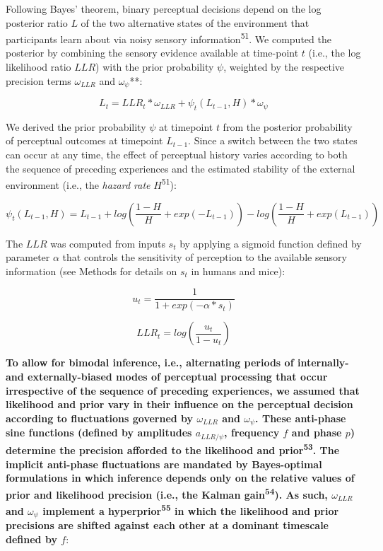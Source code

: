 \documentclass[
]{article}
\begin{document}
Following Bayes' theorem, binary perceptual decisions depend on the log
posterior ratio \(L\) of the two alternative states of the environment
that participants learn about via noisy sensory
information\textsuperscript{51}. We computed the posterior by combining
the sensory evidence available at time-point \(t\) (i.e., the log
likelihood ratio \(LLR\)) with the prior probability \(\psi\), weighted
by the respective precision terms \(\omega_{LLR}\) and
\(\omega_{\psi}\)**:

\begin{equation}
L_t = LLR_t * \omega_{LLR} + \psi_t(L_{t-1}, H) * \omega_{\psi}
\end{equation}

We derived the prior probability \(\psi\) at timepoint \(t\) from the
posterior probability of perceptual outcomes at timepoint \(L_{t-1}\).
Since a switch between the two states can occur at any time, the effect
of perceptual history varies according to both the sequence of preceding
experiences and the estimated stability of the external environment
(i.e., the \emph{hazard rate} \(H\)\textsuperscript{51}):

\begin{equation}
\psi_t(L_{t-1}, H)  = L_{t-1} + log(\frac{1-H}{H} + exp(-L_{t-1})) - log(\frac{1-H}{H} + exp(L_{t-1}))
\end{equation}

The \(LLR\) was computed from inputs \(s_t\) by applying a sigmoid
function defined by parameter \(\alpha\) that controls the sensitivity
of perception to the available sensory information (see Methods for
details on \(s_t\) in humans and mice):

\begin{equation}
u_t = \frac{1}{1 + exp(-\alpha * s_t)}
\end{equation}

\begin{equation}
LLR_t = log(\frac{u_t}{1-u_t})
\end{equation}

\textbf{To allow for bimodal inference, i.e., alternating periods of
internally- and externally-biased modes of perceptual processing that
occur irrespective of the sequence of preceding experiences, we assumed
that likelihood and prior vary in their influence on the perceptual
decision according to fluctuations governed by \(\omega_{LLR}\) and
\(\omega_{\psi}\). These anti-phase sine functions (defined by
amplitudes \(a_{LLR/\psi}\), frequency \(f\) and phase \(p\)) determine
the precision afforded to the likelihood and prior\textsuperscript{53}.
The implicit anti-phase fluctuations are mandated by Bayes-optimal
formulations in which inference depends only on the relative values of
prior and likelihood precision (i.e., the Kalman
gain\textsuperscript{54}). As such, \(\omega_{LLR}\) and
\(\omega_{\psi}\) implement a hyperprior\textsuperscript{55} in which
the likelihood and prior precisions are shifted against each other at a
dominant timescale defined by \(f\)}:
\end{document}
